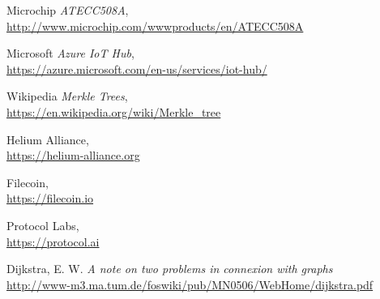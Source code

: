 \documentclass[letterpaper,11pt]{article}
\begin{document}
\begin{thebibliography}{9}
    Microchip
        \emph{ATECC508A}, \\
        \url{http://www.microchip.com/wwwproducts/en/ATECC508A}

    Microsoft
        \emph{Azure IoT Hub}, \\
        \url{https://azure.microsoft.com/en-us/services/iot-hub/}

    Wikipedia
        \emph{Merkle Trees}, \\
        \url{https://en.wikipedia.org/wiki/Merkle_tree}

    Helium Alliance, \\
        \url{https://helium-alliance.org}

    Filecoin, \\
        \url{https://filecoin.io}

    Protocol Labs, \\
        \url{https://protocol.ai}

    Dijkstra, E. W.
    \emph{A note on two problems in connexion with graphs} \\
    \url{http://www-m3.ma.tum.de/foswiki/pub/MN0506/WebHome/dijkstra.pdf}

\end{thebibliography}
\end{document}
